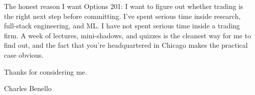 \documentclass[letterpaper,11pt]{article}
\begin{document}
The honest reason I want Options 201: I want to figure out whether trading is the right next step before committing. I've spent serious time inside research, full-stack engineering, and ML. I have not spent serious time inside a trading firm. A week of lectures, mini-shadows, and quizzes is the cleanest way for me to find out, and the fact that you're headquartered in Chicago makes the practical case obvious.

Thanks for considering me.

\vspace{4pt}

\noindent Charles Benello
\end{document}
